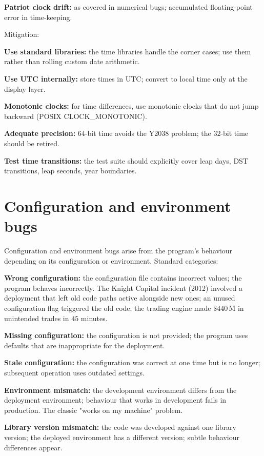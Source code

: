 \textbf{Patriot clock drift:} as covered in numerical bugs; accumulated floating-point error in time-keeping.

Mitigation:

\textbf{Use standard libraries:} the time libraries handle the corner cases; use them rather than rolling custom date arithmetic.

\textbf{Use UTC internally:} store times in UTC; convert to local time only at the display layer.

\textbf{Monotonic clocks:} for time differences, use monotonic clocks that do not jump backward (POSIX CLOCK\_MONOTONIC).

\textbf{Adequate precision:} $64$-bit time avoids the Y2038 problem; the $32$-bit time should be retired.

\textbf{Test time transitions:} the test suite should explicitly cover leap days, DST transitions, leap seconds, year boundaries.

\section{Configuration and environment bugs}

Configuration and environment bugs arise from the program's behaviour depending on its configuration or environment. Standard categories:

\textbf{Wrong configuration:} the configuration file contains incorrect values; the program behaves incorrectly. The Knight Capital incident (2012) involved a deployment that left old code paths active alongside new ones; an unused configuration flag triggered the old code; the trading engine made $\$440\,\text{M}$ in unintended trades in $45$ minutes.

\textbf{Missing configuration:} the configuration is not provided; the program uses defaults that are inappropriate for the deployment.

\textbf{Stale configuration:} the configuration was correct at one time but is no longer; subsequent operation uses outdated settings.

\textbf{Environment mismatch:} the development environment differs from the deployment environment; behaviour that works in development fails in production. The classic "works on my machine" problem.

\textbf{Library version mismatch:} the code was developed against one library version; the deployed environment has a different version; subtle behaviour differences appear.


